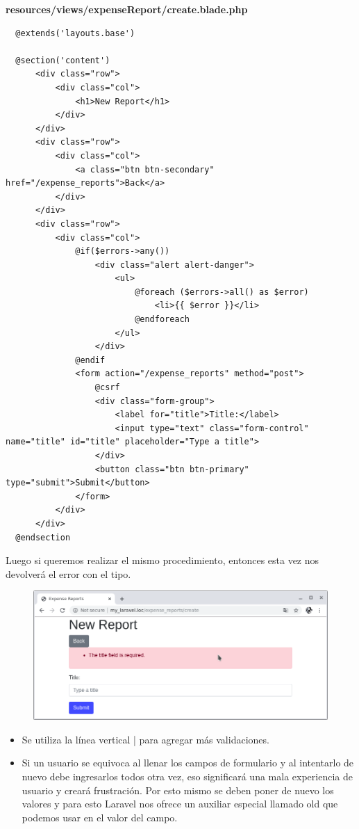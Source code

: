 \documentclass{article}
\begin{document}
\textbf{resources/views/expenseReport/create.blade.php}
\begin{verbatim}
  @extends('layouts.base')

  @section('content')
      <div class="row">
          <div class="col">
              <h1>New Report</h1>
          </div>
      </div>
      <div class="row">
          <div class="col">
              <a class="btn btn-secondary" href="/expense_reports">Back</a>
          </div>
      </div>
      <div class="row">
          <div class="col">
              @if($errors->any())
                  <div class="alert alert-danger">
                      <ul>
                          @foreach ($errors->all() as $error)
                              <li>{{ $error }}</li>
                          @endforeach
                      </ul>
                  </div>
              @endif
              <form action="/expense_reports" method="post">
                  @csrf
                  <div class="form-group">
                      <label for="title">Title:</label>
                      <input type="text" class="form-control" name="title" id="title" placeholder="Type a title">
                  </div>
                  <button class="btn btn-primary" type="submit">Submit</button>
              </form>
          </div>
      </div>
  @endsection
\end{verbatim}

Luego si queremos realizar el mismo procedimiento, entonces esta vez nos
devolverá el error con el tipo.

\begin{figure}[h!]
  \centering
  \includegraphics[scale=0.5]{./Pictures/090_error_type.png}
\end{figure}


\begin{itemize}
  \item Se utiliza la línea vertical | para agregar más validaciones.
  \item Si un usuario se equivoca al llenar los campos de formulario y al
    intentarlo de nuevo debe ingresarlos todos otra vez, eso significará una
    mala experiencia de usuario y creará frustración. Por esto mismo se deben
    poner de nuevo los valores y para esto Laravel nos ofrece un auxiliar
    especial llamado old que podemos usar en el valor del campo.
\end{itemize}
\end{document}
